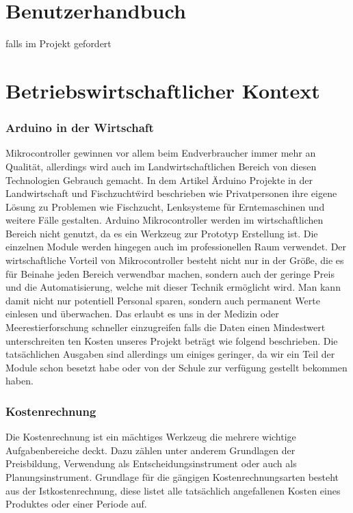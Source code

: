 \chapter{Benutzerhandbuch} 
falls im Projekt gefordert

\newpage
\chapter{Betriebswirtschaftlicher Kontext}


\def \currentAuthor {Kevin Glatz}

                                                                        
\subsection{Arduino in der Wirtschaft}
Mikrocontroller gewinnen vor allem beim Endverbraucher immer mehr an Qualität, allerdings wird auch im Landwirtschaftlichen Bereich von diesen Technologien Gebrauch gemacht. In dem Artikel \"Arduino Projekte in der Landwirtschaft und Fischzucht\" wird beschrieben wie Privatpersonen ihre eigene Lösung zu Problemen wie Fischzucht, Lenksysteme für Erntemaschinen und weitere Fälle gestalten. 
Arduino Mikrocontroller werden im wirtschaftlichen Bereich nicht genutzt, da es ein Werkzeug zur Prototyp Erstellung  ist. Die einzelnen Module werden hingegen auch im professionellen Raum verwendet. Der wirtschaftliche Vorteil von Mikrocontroller besteht nicht nur in der Größe, die es für Beinahe jeden Bereich verwendbar machen, sondern auch der geringe Preis und die Automatisierung, welche mit dieser Technik ermöglicht wird. Man kann damit nicht nur potentiell Personal sparen, sondern auch permanent Werte einlesen und überwachen. Das erlaubt es uns in der Medizin oder Meerestierforschung schneller einzugreifen falls die Daten einen Mindestwert unterschreiten
ten Kosten unseres Projekt beträgt wie folgend beschrieben. Die tatsächlichen Ausgaben sind allerdings um einiges geringer, da wir ein Teil der Module schon besetzt habe oder von der Schule zur verfügung gestellt bekommen haben.



\subsection{Kostenrechnung}

Die Kostenrechnung ist ein mächtiges Werkzeug die mehrere wichtige Aufgabenbereiche deckt. Dazu zählen unter anderem Grundlagen der Preisbildung, Verwendung als Entscheidungsinstrument oder auch als Planungsinstrument. Grundlage für die gängigen Kostenrechnungsarten besteht aus der Istkostenrechnung, diese listet alle tatsächlich angefallenen Kosten eines Produktes oder einer Periode auf. \cite{KORE}


